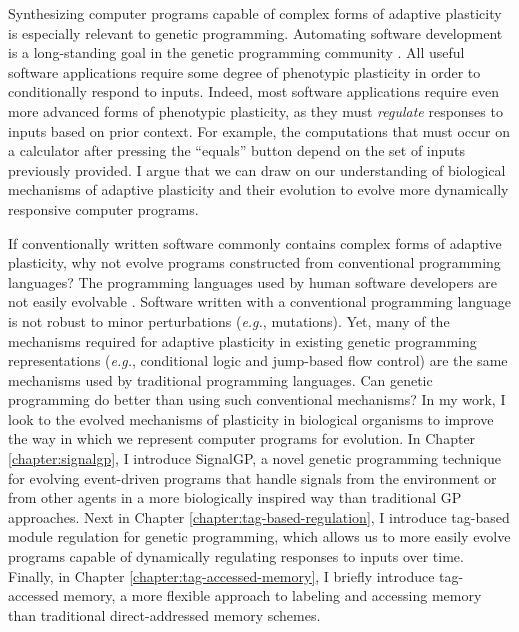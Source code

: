 Synthesizing computer programs capable of complex forms of adaptive plasticity is especially relevant to genetic programming.
Automating software development is a long-standing goal in the genetic programming community \citep{koza_hierarchical_1989,oneill_automatic_2019}.
All useful software applications require some degree of phenotypic plasticity in order to conditionally respond to inputs.
Indeed, most software applications require even more advanced forms of phenotypic plasticity, as they must \textit{regulate} responses to inputs based on prior context.
For example, the computations that must occur on a calculator after pressing the ``equals'' button depend on the set of inputs previously provided.
I argue that we can draw on our understanding of biological mechanisms of adaptive plasticity and their evolution to evolve more dynamically responsive computer programs.

If conventionally written software commonly contains complex forms of adaptive plasticity, why not evolve programs constructed from conventional programming languages?
The programming languages used by human software developers are not easily evolvable \citep{rasmussen_coreworld_1990}.
Software written with a conventional programming language is not robust to minor perturbations (\textit{e.g.}, mutations). 
Yet, many of the mechanisms required for adaptive plasticity in existing genetic programming representations (\textit{e.g.}, conditional logic and jump-based flow control) are the same mechanisms used by traditional programming languages. 
Can genetic programming do better than using such conventional mechanisms?
In my work, I look to the evolved mechanisms of plasticity in biological organisms to improve the way in which we represent computer programs for evolution.
In Chapter \ref{chapter:signalgp}, I introduce SignalGP, a novel genetic programming technique for evolving event-driven programs that handle signals from the environment or from other agents in a more biologically inspired way than traditional GP approaches.
Next in Chapter \ref{chapter:tag-based-regulation}, I introduce tag-based module regulation for genetic programming, which allows us to more easily evolve programs capable of dynamically regulating responses to inputs over time.
Finally, in Chapter \ref{chapter:tag-accessed-memory}, I briefly introduce tag-accessed memory, a more flexible approach to labeling and accessing memory than traditional direct-addressed memory schemes.